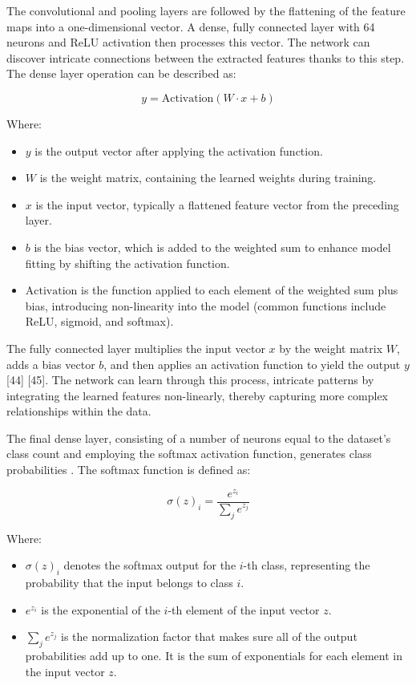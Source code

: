 \documentclass[journal,article,submit,pdftex,moreauthors]{Definitions/mdpi}
\begin{document}
The convolutional and pooling layers are followed by the flattening of the feature maps into a one-dimensional vector. A dense, fully connected layer with 64 neurons and ReLU activation \cite{bishop2006pattern} then processes this vector. The network can discover intricate connections between the extracted features thanks to this step. The dense layer operation can be described as:

\begin{equation}
    y = \text{Activation}(W \cdot x + b)
\end{equation}

Where:

\begin{itemize}
  \item \(y\) is the output vector after applying the activation function.
  \item \(W\) is the weight matrix, containing the learned weights during training.
  \item \(x\) is the input vector, typically a flattened feature vector from the preceding layer.
  \item \(b\) is the bias vector, which is added to the weighted sum to enhance model fitting by shifting the activation function.
  \item \(\text{Activation}\) is the function applied to each element of the weighted sum plus bias, introducing non-linearity into the model (common functions include ReLU, sigmoid, and softmax).
\end{itemize}

The fully connected layer multiplies the input vector \(x\) by the weight matrix \(W\), adds a bias vector \(b\), and then applies an activation function to yield the output \(y\) [44] [45]. The network can learn through this process, intricate patterns by integrating the learned features non-linearly, thereby capturing more complex relationships within the data.

The final dense layer, consisting of a number of neurons equal to the dataset's class count and employing the softmax activation function, generates class probabilities \cite{goodfellow2016deep}. The softmax function is defined as:


\begin{equation}
    \sigma(z)_i = \frac{e^{z_i}}{\sum_{j} e^{z_j}}
\end{equation}

Where:

\begin{itemize}
  \item \(\sigma(z)_i\) denotes the softmax output for the \(i\)-th class, representing the probability that the input belongs to class \(i\).
  \item \(e^{z_i}\) is the exponential of the \(i\)-th element of the input vector \(z\).
  \item \(\sum_{j} e^{z_j}\) is the normalization factor that makes sure all of the output probabilities add up to one. It is the sum of exponentials for each element in the input vector \(z\).
\end{itemize}
\end{document}
